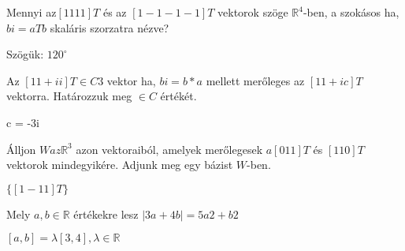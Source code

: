 \begin{frame}
  \begin{tcolorbox}[title={10/1. -N-}]
    Mennyi az$[1 1 1 1]T$ és az $[1 -1 -1 -1]T$ vektorok szöge $\mathbb{R}^4$-ben, a szokásos ha, $bi = aTb$ skaláris szorzatra nézve?

  \tcblower

    \mmedskip 
    
    Szögük: $120^{\circ}$

  \end{tcolorbox}
\end{frame}


\begin{frame}
  \begin{tcolorbox}[title={10/2. -R-}]
    Az $[1 1 + i i]T \in C3$ vektor ha, $bi = b*a$ mellett merőleges az $[1 1 + i c]T$ vektorra. Határozzuk meg $ \in C$ értékét.


  \tcblower

    \mmedskip 
    
    c = -3i
  \end{tcolorbox}
\end{frame}


\begin{frame}
  \begin{tcolorbox}[title={10/3. -R-}]
    Álljon $W az \mathbb{R}^3$ azon vektoraiból, amelyek merőlegesek $a[0 1 1]T$ és $[1 1 0]T$ vektorok mindegyikére. Adjunk meg egy bázist $W$-ben.

  \tcblower

    \mmedskip 
    
    $\{[1 -1 1]T\}$
  \end{tcolorbox}
\end{frame}


\begin{frame}
  \begin{tcolorbox}[title={10/4. -Q-}]
    Mely $a,b \in \mathbb{R}$ értékekre lesz $|3a + 4b| = 5a2 + b2$

  \tcblower

    \mmedskip 
    
    $[a,b] = {\lambda}[3,4], {\lambda} \in \mathbb{R}$
  \end{tcolorbox}
\end{frame}


